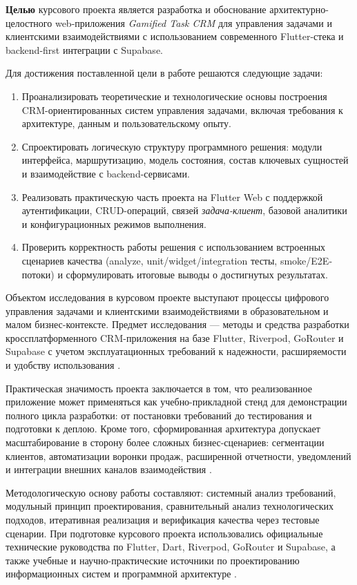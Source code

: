 \textbf{Целью} курсового проекта является разработка и обоснование архитектурно-целостного web-приложения \textit{Gamified Task CRM} для управления задачами и клиентскими взаимодействиями с использованием современного Flutter-стека и backend-first интеграции с Supabase.

Для достижения поставленной цели в работе решаются следующие задачи:
\begin{enumerate}
  \item Проанализировать теоретические и технологические основы построения CRM-ориентированных систем управления задачами, включая требования к архитектуре, данным и пользовательскому опыту.
  \item Спроектировать логическую структуру программного решения: модули интерфейса, маршрутизацию, модель состояния, состав ключевых сущностей и взаимодействие с backend-сервисами.
  \item Реализовать практическую часть проекта на Flutter Web с поддержкой аутентификации, CRUD-операций, связей \textit{задача-клиент}, базовой аналитики и конфигурационных режимов выполнения.
  \item Проверить корректность работы решения с использованием встроенных сценариев качества (analyze, unit/widget/integration тесты, smoke/E2E-потоки) и сформулировать итоговые выводы о достигнутых результатах.
\end{enumerate}

Объектом исследования в курсовом проекте выступают процессы цифрового управления задачами и клиентскими взаимодействиями в образовательном и малом бизнес-контексте. Предмет исследования --- методы и средства разработки кроссплатформенного CRM-приложения на базе Flutter, Riverpod, GoRouter и Supabase с учетом эксплуатационных требований к надежности, расширяемости и удобству использования \cite{supabaseDocs,postgresDocs}.

Практическая значимость проекта заключается в том, что реализованное приложение может применяться как учебно-прикладной стенд для демонстрации полного цикла разработки: от постановки требований до тестирования и подготовки к деплою. Кроме того, сформированная архитектура допускает масштабирование в сторону более сложных бизнес-сценариев: сегментации клиентов, автоматизации воронки продаж, расширенной отчетности, уведомлений и интеграции внешних каналов взаимодействия \cite{crmBook,projectManagementBook}.

Методологическую основу работы составляют: системный анализ требований, модульный принцип проектирования, сравнительный анализ технологических подходов, итеративная реализация и верификация качества через тестовые сценарии. При подготовке курсового проекта использовались официальные технические руководства по Flutter, Dart, Riverpod, GoRouter и Supabase, а также учебные и научно-практические источники по проектированию информационных систем и программной архитектуре \cite{flutterDocs,dartDocs,riverpodDocs,goRouterDocs,supabaseDocs,isDesign2025}.

